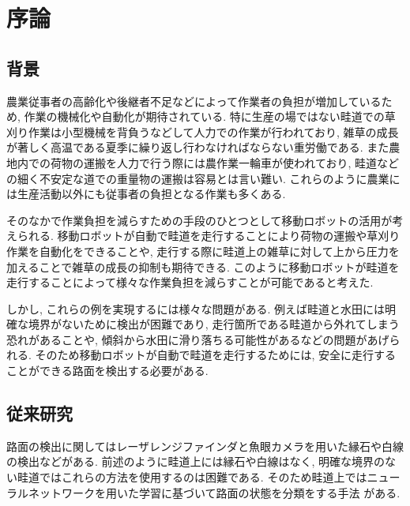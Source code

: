 \chapter{序論}
\section{背景}
農業従事者の高齢化や後継者不足などによって作業者の負担が増加しているため, 作業の機械化や自動化が期待されている. 
特に生産の場ではない畦道での草刈り作業は小型機械を背負うなどして人力での作業が行われており, 雑草の成長が著しく高温である夏季に繰り返し行わなければならない重労働である. 
また農地内での荷物の運搬を人力で行う際には農作業一輪車が使われており, 畦道などの細く不安定な道での重量物の運搬は容易とは言い難い. 
これらのように農業には生産活動以外にも従事者の負担となる作業も多くある.  

そのなかで作業負担を減らすための手段のひとつとして移動ロボットの活用が考えられる. 
移動ロボットが自動で畦道を走行することにより荷物の運搬や草刈り作業を自動化をできることや, 
走行する際に畦道上の雑草に対して上から圧力を加えることで雑草の成長の抑制も期待できる\cite{稲垣栄洋2017踏圧処理が畦畔雑草植生に及ぼす影響}. 
このように移動ロボットが畦道を走行することによって様々な作業負担を減らすことが可能であると考えた. 

しかし, これらの例を実現するには様々な問題がある.  
例えば畦道と水田には明確な境界がないために検出が困難であり, 走行箇所である畦道から外れてしまう恐れがあることや, 
傾斜から水田に滑り落ちる可能性があるなどの問題があげられる. 
そのため移動ロボットが自動で畦道を走行するためには, 安全に走行することができる路面を検出する必要がある.
\section{従来研究}
路面の検出に関してはレーザレンジファインダと魚眼カメラを用いた縁石や白線の検出\cite{土谷千加夫2015自律走行のための白線と縁石に基づく自己位置推定}などがある. 
前述のように畦道上には縁石や白線はなく, 明確な境界のない畦道ではこれらの方法を使用するのは困難である. 
そのため畦道上ではニューラルネットワークを用いた学習に基づいて路面の状態を分類をする手法
\cite{長橋孝哉2019ニューラルネットワークを用いた畦道の雑草検出に関する研究}がある.

